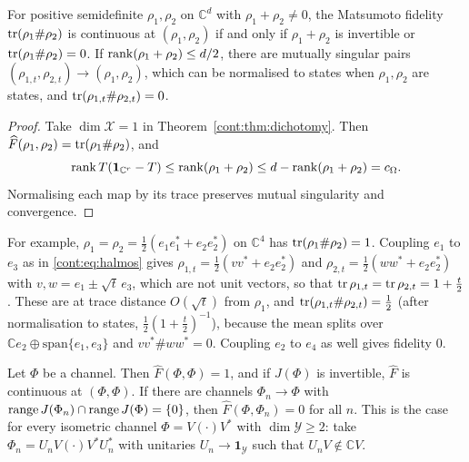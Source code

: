 \begin{corollary}[States]\label{cont:cor:states dichotomy}
For positive semidefinite $\rho_1,\rho_2$ on $\mathbb{C}^d$ with $\rho_1+\rho_2\neq0$, the Matsumoto fidelity $\operatorname{tr}(\rho_1\#\rho_2)$ is continuous at $(\rho_1,\rho_2)$ if and only if $\rho_1+\rho_2$ is invertible or $\operatorname{tr}(\rho_1\#\rho_2)=0$. If $\operatorname{rank}(\rho_1+\rho_2)\leq d/2$, there are mutually singular pairs $(\rho_{1,t},\rho_{2,t})\to(\rho_1,\rho_2)$, which can be normalised to states when $\rho_1,\rho_2$ are states, and $\operatorname{tr}(\rho_{1,t}\#\rho_{2,t})=0$.
\end{corollary}

\begin{proof}
Take $\dim\mathcal{X}=1$ in Theorem~\ref{cont:thm:dichotomy}. Then $\widehat F(\rho_1,\rho_2)=\operatorname{tr}(\rho_1\#\rho_2)$, and
\[
\operatorname{rank} T(\mathbf{1}_{\mathbb{C}^r}-T)\leq\operatorname{rank}(\rho_1+\rho_2)\leq d-\operatorname{rank}(\rho_1+\rho_2)=c_\Omega.
\]
Normalising each map by its trace preserves mutual singularity and convergence.
\end{proof}

For example, $\rho_1=\rho_2=\frac12(e_1e_1^*+e_2e_2^*)$ on $\mathbb{C}^4$ has $\operatorname{tr}(\rho_1\#\rho_2)=1$. Coupling $e_1$ to $e_3$ as in \eqref{cont:eq:halmos} gives $\rho_{1,t}=\frac12(vv^*+e_2e_2^*)$ and $\rho_{2,t}=\frac12(ww^*+e_2e_2^*)$ with $v,w=e_1\pm\sqrt t\,e_3$, which are not unit vectors, so that $\operatorname{tr}\rho_{1,t}=\operatorname{tr}\rho_{2,t}=1+\frac t2$. These are at trace distance $O(\sqrt t)$ from $\rho_1$, and $\operatorname{tr}(\rho_{1,t}\#\rho_{2,t})=\frac12$ (after normalisation to states, $\frac12(1+\frac t2)^{-1}$), because the mean splits over $\mathbb{C}e_2\oplus\mathrm{span}\{e_1,e_3\}$ and $vv^*\#ww^*=0$. Coupling $e_2$ to $e_4$ as well gives fidelity $0$.

\begin{corollary}[Channels]\label{cont:cor:channels dichotomy}
Let $\Phi$ be a channel. Then $\widehat F(\Phi,\Phi)=1$, and if $J(\Phi)$ is invertible, $\widehat F$ is continuous at $(\Phi,\Phi)$. If there are channels $\Phi_n\to\Phi$ with $\operatorname{range} J(\Phi_n)\cap\operatorname{range} J(\Phi)=\{0\}$, then $\widehat F(\Phi,\Phi_n)=0$ for all $n$. This is the case for every isometric channel $\Phi=V(\cdot)V^*$ with $\dim\mathcal{Y}\geq2$: take $\Phi_n=U_nV(\cdot)V^*U_n^*$ with unitaries $U_n\to\mathbf{1}_{\mathcal{Y}}$ such that $U_nV\notin\mathbb{C}V$.
\end{corollary}

